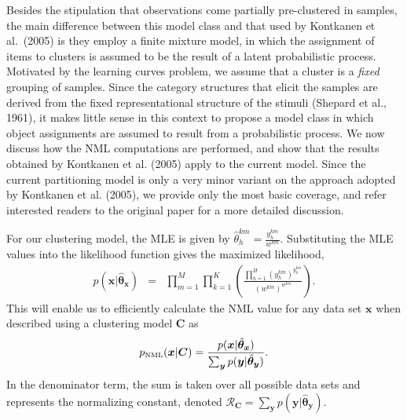 \documentclass{elsart}
\begin{document}
Besides the stipulation that observations come partially pre-clustered in samples, the main
difference between this model class and that used by Kontkanen et al.~(2005) is they employ a
finite mixture model, in which the assignment of items to clusters is assumed to be the result of
a latent probabilistic process. Motivated by the learning curves problem, we assume that a cluster
is a \emph{fixed} grouping of samples. Since the category structures that elicit the samples are
derived from the fixed representational structure of the stimuli (Shepard et al., 1961), it makes
little sense in this context to propose a model class in which object assignments are assumed to
result from a probabilistic process. We now discuss how the NML computations are performed, and
show that the results obtained by Kontkanen et al. (2005) apply to the current model. Since the
current partitioning model is only a very minor variant on the approach adopted by Kontkanen et
al. (2005), we provide only the most basic coverage, and refer interested readers to the original
paper for a more detailed discussion.


For our clustering model, the MLE is given by $\hat{\theta}^{km}_h = \frac{y^{km}_h}{w^{km}}$.
Substituting the MLE values into the likelihood function gives the maximized likelihood,
\begin{eqnarray*}
p(\bm{x} | \hat{\bm{\theta}}_{\bm x}) &=& \prod_{m=1}^M \prod_{k=1}^K \left( \frac{ \prod_{h=1}^H
(y^{km}_h)^{y^{km}_h}}{(w^{km})^{w^{km}}} \right).
\end{eqnarray*}
This will enable us to efficiently calculate the NML value for any data set $\bm{x}$ when
described using a clustering model $\bm{C}$ as
\begin{displaymath}
p_{\mbox{\tiny NML}}(\bm{x}|\bm{C}) = \frac{p(\bm{x}|\hat{\bm{\theta}}_{\bm x})}{\sum_{\bm{y}}
p(\bm{y}| \hat{\bm{\theta}}_{\bm y})}.
\end{displaymath}
In the denominator term, the sum is taken over all possible data sets and represents the
normalizing constant, denoted $\mathcal{R}_{\bm{C}} = \sum_{\bm{y}}
p(\bm{y}|\hat{\bm{\theta}}_{\bm{y}})$.
\end{document}
